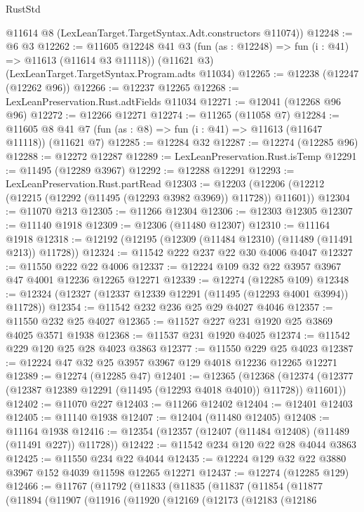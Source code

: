 \begin{lexlean}{RustStd}
\begin{coremodule}
    @11614 @8 (LexLeanTarget.TargetSyntax.Adt.constructors @11074))
@12248 := @6 @3
@12262 := @11605
    @12248
    @41
    @3
    (fun (as : @12248) => fun (i : @41) => @11613 (@11614 @3 @11118))
    (@11621 @3)
    (LexLeanTarget.TargetSyntax.Program.adts @11034)
@12265 := @12238 (@12247 (@12262 @96))
@12266 := @12237 @12265
@12268 := LexLeanPreservation.Rust.adtFields @11034
@12271 := @12041 (@12268 @96 @96)
@12272 := @12266 @12271
@12274 := @11265 (@11058 @7)
@12284 := @11605 @8 @41 @7 (fun (as : @8) => fun (i : @41) => @11613 (@11647 @11118)) (@11621 @7)
@12285 := @12284 @32
@12287 := @12274 (@12285 @96)
@12288 := @12272 @12287
@12289 := LexLeanPreservation.Rust.isTemp
@12291 := @11495 (@12289 @3967)
@12292 := @12288 @12291
@12293 := LexLeanPreservation.Rust.partRead
@12303 := @12203 (@12206 (@12212 (@12215 (@12292 (@11495 (@12293 @3982 @3969)) @11728)) @11601))
@12304 := @11070 @213
@12305 := @11266 @12304
@12306 := @12303 @12305
@12307 := @11140 @1918
@12309 := @12306 (@11480 @12307)
@12310 := @11164 @1918
@12318 := @12192 (@12195 (@12309 (@11484 @12310) (@11489 (@11491 @213)) @11728))
@12324 := @11542 @222 @237 @22 @30 @4006 @4047
@12327 := @11550 @222 @22 @4006
@12337 := @12224 @109 @32 @22 @3957 @3967 @47 @4001 @12236 @12265 @12271
@12339 := @12274 (@12285 @109)
@12348 := @12324 (@12327 (@12337 @12339 @12291 (@11495 (@12293 @4001 @3994)) @11728))
@12354 := @11542 @232 @236 @25 @29 @4027 @4046
@12357 := @11550 @232 @25 @4027
@12365 := @11527 @227 @231 @1920 @25 @3869 @4025 @3571 @1938
@12368 := @11537 @231 @1920 @4025
@12374 := @11542 @229 @120 @25 @28 @4023 @3863
@12377 := @11550 @229 @25 @4023
@12387 := @12224 @47 @32 @25 @3957 @3967 @129 @4018 @12236 @12265 @12271
@12389 := @12274 (@12285 @47)
@12401 := @12365
    (@12368 (@12374 (@12377 (@12387 @12389 @12291 (@11495 (@12293 @4018 @4010)) @11728)) @11601))
@12402 := @11070 @227
@12403 := @11266 @12402
@12404 := @12401 @12403
@12405 := @11140 @1938
@12407 := @12404 (@11480 @12405)
@12408 := @11164 @1938
@12416 := @12354 (@12357 (@12407 (@11484 @12408) (@11489 (@11491 @227)) @11728))
@12422 := @11542 @234 @120 @22 @28 @4044 @3863
@12425 := @11550 @234 @22 @4044
@12435 := @12224 @129 @32 @22 @3880 @3967 @152 @4039 @11598 @12265 @12271
@12437 := @12274 (@12285 @129)
@12466 := @11767
    (@11792
      (@11833
        (@11835
          (@11837
            (@11854
              (@11877
                (@11894
                  (@11907
                    (@11916
                      (@11920
                        (@12169
                          (@12173
                            (@12183
                              (@12186

\end{coremodule}
\end{lexlean}
